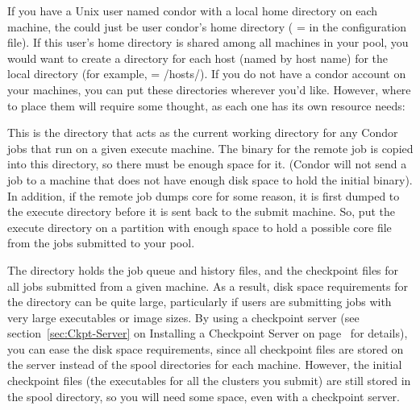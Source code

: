 \begin{description}
If you have a Unix user named condor with a local home directory on each
machine, the  could just be user condor's home
directory ( =  in the 
configuration file).
If this user's home directory is shared among all machines in your
pool, you would want to create a directory for each host (named by
host name) for the local directory (for example,  =
/hosts/).  If you do not
have a condor account on your machines, you can put these directories
wherever you'd like.
However, where to place them will require some
thought, as each one has its own resource needs:

\begin{description}
\item[\File{execute}] This is the directory that acts as the current working
directory for any Condor jobs that run on a given execute machine.
The binary for the remote job is copied into this directory, so
there
must be enough space for it.  (Condor will not send a job to a
machine that does not have enough disk space to hold the initial
binary).  In addition, if the remote job dumps core for some reason,
it is first dumped to the execute directory before it is sent back to
the submit machine.  So, put the execute directory on
a partition with enough space to hold a possible core file from the
jobs submitted to your pool.

\item[\File{spool}] The  directory holds the job queue
and history files,
and the checkpoint files for all jobs submitted from a given machine.
As a result, disk space requirements for the  directory
can be quite large,
particularly if users are submitting jobs with very large
executables or image sizes.
By using a checkpoint server
(see section~\ref{sec:Ckpt-Server} on Installing a Checkpoint Server on
page~\pageref{sec:Ckpt-Server} for details),
you can ease the disk
space requirements, since all checkpoint files are stored on the
server instead of the spool directories for each machine.  However,
the initial checkpoint files (the executables for all the clusters you
submit) are still stored in the spool directory, so you will need
%
%
some space, even with a checkpoint server.


\end{description}
\end{description}
